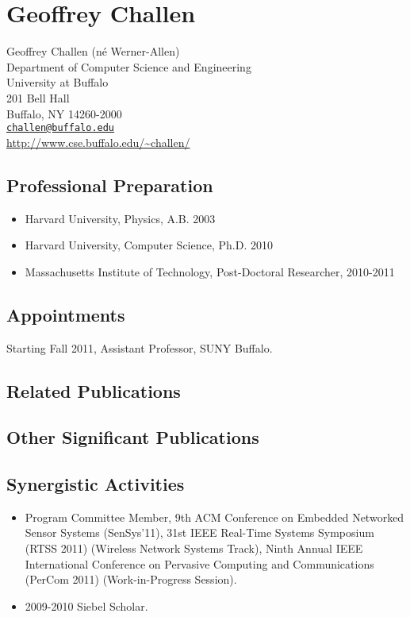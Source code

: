 \chapter{Geoffrey Challen}

Geoffrey Challen (n\'{e} Werner-Allen)\\
Department of Computer Science and Engineering\\
University at Buffalo\\
201 Bell Hall\\
Buffalo, NY 14260-2000\\
\href{mailto:challen@buffalo.edu}{\texttt{challen@buffalo.edu}}\\
\url{http://www.cse.buffalo.edu/~challen/}

\section{Professional Preparation}

\begin{itemize}
\item Harvard University, Physics, A.B. 2003
\item Harvard University, Computer Science, Ph.D. 2010
\item Massachusetts Institute of Technology, Post-Doctoral Researcher, 2010-2011
\end{itemize}

\section{Appointments}

Starting Fall 2011, Assistant Professor, SUNY Buffalo.

\section{Related Publications}

\section{Other Significant Publications}

\section{Synergistic Activities}

\begin{itemize}

\item Program Committee Member, 9th ACM Conference on Embedded Networked Sensor
Systems (SenSys'11), 31st IEEE Real-Time Systems Symposium (RTSS 2011)
(Wireless Network Systems Track), Ninth Annual IEEE International Conference on
Pervasive Computing and Communications (PerCom 2011) (Work-in-Progress
Session).
\item 2009-2010 Siebel Scholar.

\end{itemize}

